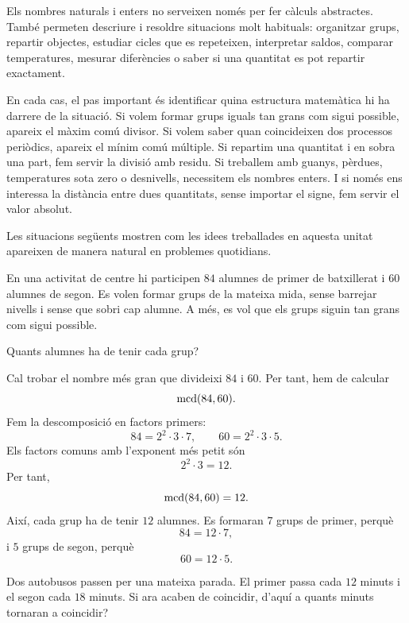 Els nombres naturals i enters no serveixen només per fer càlculs abstractes. També permeten descriure i resoldre situacions molt habituals: organitzar grups, repartir objectes, estudiar cicles que es repeteixen, interpretar saldos, comparar temperatures, mesurar diferències o saber si una quantitat es pot repartir exactament.

En cada cas, el pas important és identificar quina estructura matemàtica hi ha darrere de la situació. Si volem formar grups iguals tan grans com sigui possible, apareix el màxim comú divisor. Si volem saber quan coincideixen dos processos periòdics, apareix el mínim comú múltiple. Si repartim una quantitat i en sobra una part, fem servir la divisió amb residu. Si treballem amb guanys, pèrdues, temperatures sota zero o desnivells, necessitem els nombres enters. I si només ens interessa la distància entre dues quantitats, sense importar el signe, fem servir el valor absolut.

Les situacions següents mostren com les idees treballades en aquesta unitat apareixen de manera natural en problemes quotidians.


\begin{exercici}
En una activitat de centre hi participen \(84\) alumnes de primer de batxillerat i \(60\) alumnes de segon. Es volen formar grups de la mateixa mida, sense barrejar nivells i sense que sobri cap alumne. A més, es vol que els grups siguin tan grans com sigui possible.

Quants alumnes ha de tenir cada grup?
\end{exercici}

\begin{solucio}
Cal trobar el nombre més gran que divideixi \(84\) i \(60\). Per tant, hem de calcular
\[
\operatorname{mcd}(84,60).
\]
Fem la descomposició en factors primers:
\[
84=2^2\cdot3\cdot7,
\qquad
60=2^2\cdot3\cdot5.
\]
Els factors comuns amb l'exponent més petit són
\[
2^2\cdot3=12.
\]
Per tant,
\[
\operatorname{mcd}(84,60)=12.
\]
Així, cada grup ha de tenir \(12\) alumnes. Es formaran \(7\) grups de primer, perquè
\[
84=12\cdot7,
\]
i \(5\) grups de segon, perquè
\[
60=12\cdot5.
\]
\end{solucio}


\begin{exercici}
Dos autobusos passen per una mateixa parada. El primer passa cada \(12\) minuts i el segon cada \(18\) minuts. Si ara acaben de coincidir, d'aquí a quants minuts tornaran a coincidir?
\end{exercici}

